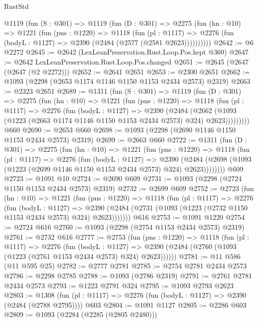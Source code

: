 \begin{lexlean}{RustStd}
\begin{coremodule}
    @1119
      (fun (S : @301) =>
      @1119
        (fun (D : @301) =>
        @2275
          (fun (hn : @10) =>
          @1221
            (fun (pns : @1220) =>
            @1118
              (fun (pl : @1117) =>
              @2276 (fun (bodyL : @1127) => @2390 (@2484 (@2577 (@2581 @2623))))))))))
@2642 := @6 @2272
@2645 := @2642 (LexLeanPreservation.Rust.Loop.Pos.kept @360)
@2647 := @2642 LexLeanPreservation.Rust.Loop.Pos.changed
@2651 := @2645 (@2647 (@2647 (@2 @2272)))
@2652 := @2641 @2651
@2653 := @2300 @2651
@2662 := @1093 (@2298 (@2653 @1174 @1146 @1150 @1153 @2434 @2573) @2319)
@2663 := @2323 @2651
@2689 := @1311
    (fun (S : @301) =>
    @1119
      (fun (D : @301) =>
      @2275
        (fun (hn : @10) =>
        @1221
          (fun (pns : @1220) =>
          @1118
            (fun (pl : @1117) =>
            @2276
              (fun (bodyL : @1127) =>
              @2390
                (@2484
                  (@2662
                    (@1093 (@1223 (@2663 @1174 @1146 @1150 @1153 @2434 @2573) @324) @2623)))))))))
    @660
@2690 := @2653 @660
@2698 := @1093 (@2298 (@2690 @1146 @1150 @1153 @2434 @2573) @2319)
@2699 := @2663 @660
@2722 := @1311
    (fun (D : @301) =>
    @2275
      (fun (hn : @10) =>
      @1221
        (fun (pns : @1220) =>
        @1118
          (fun (pl : @1117) =>
          @2276
            (fun (bodyL : @1127) =>
            @2390
              (@2484 (@2698 (@1093 (@1223 (@2699 @1146 @1150 @1153 @2434 @2573) @324) @2623))))))))
    @609
@2723 := @1091 @10
@2724 := @2690 @609
@2731 := @1093 (@2298 (@2724 @1150 @1153 @2434 @2573) @2319)
@2732 := @2699 @609
@2752 := @2723
    (fun (hn : @10) =>
    @1221
      (fun (pns : @1220) =>
      @1118
        (fun (pl : @1117) =>
        @2276
          (fun (bodyL : @1127) =>
          @2390 (@2484 (@2731 (@1093 (@1223 (@2732 @1150 @1153 @2434 @2573) @324) @2623)))))))
    @616
@2753 := @1091 @1220
@2754 := @2724 @616
@2760 := @1093 (@2298 (@2754 @1153 @2434 @2573) @2319)
@2761 := @2732 @616
@2777 := @2753
    (fun (pns : @1220) =>
    @1118
      (fun (pl : @1117) =>
      @2276
        (fun (bodyL : @1127) =>
        @2390 (@2484 (@2760 (@1093 (@1223 (@2761 @1153 @2434 @2573) @324) @2623))))))
@2781 := @11 @586 (@11 @595 @25)
@2782 := @2777 @2781
@2785 := @2754 @2781 @2434 @2573
@2786 := @2298 @2785
@2788 := @1093 (@2786 @2319)
@2791 := @2761 @2781 @2434 @2573
@2793 := @1223 @2791 @324
@2795 := @1093 @2793 @2623
@2803 := @1308 (fun (pl : @1117) => @2276 (fun (bodyL : @1127) => @2390 (@2484 (@2788 @2795)))) @603
@2804 := @1091 @1127
@2805 := @2286 @603
@2809 := @1093 (@2284 (@2285 (@2805 @2480)))

\end{coremodule}
\end{lexlean}
